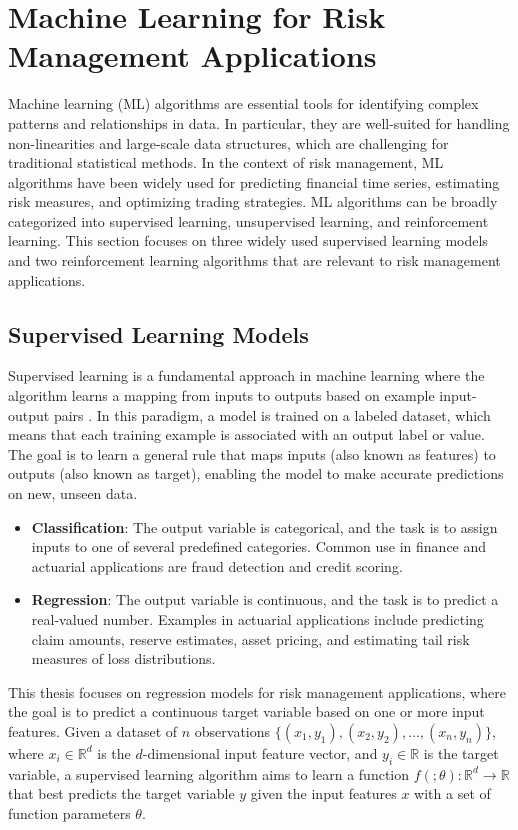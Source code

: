 \section{Machine Learning for Risk Management Applications}

Machine learning (ML) algorithms are essential tools for identifying complex patterns and relationships in data. 
In particular, they are well-suited for handling non-linearities and large-scale data structures, which are challenging for traditional statistical methods. 
In the context of risk management, ML algorithms have been widely used for predicting financial time series, estimating risk measures, and optimizing trading strategies.
ML algorithms can be broadly categorized into supervised learning, unsupervised learning, and reinforcement learning.
This section focuses on three widely used supervised learning models and two reinforcement learning algorithms that are relevant to risk management applications.

\subsection{Supervised Learning Models}

Supervised learning is a fundamental approach in machine learning where the algorithm learns a mapping from inputs to outputs based on example input-output pairs \cite{galton1886regression}. 
In this paradigm, a model is trained on a labeled dataset, which means that each training example is associated with an output label or value. 
The goal is to learn a general rule that maps inputs (also known as features) to outputs (also known as target), enabling the model to make accurate predictions on new, unseen data.

\begin{itemize} 
    \item \textbf{Classification}: The output variable is categorical, and the task is to assign inputs to one of several predefined categories. 
    Common use in finance and actuarial applications are fraud detection and credit scoring.
    \item \textbf{Regression}: The output variable is continuous, and the task is to predict a real-valued number. 
    Examples in actuarial applications include predicting claim amounts, reserve estimates, asset pricing, and estimating tail risk measures of loss distributions.
\end{itemize}

This thesis focuses on regression models for risk management applications, where the goal is to predict a continuous target variable based on one or more input features.
Given a dataset of $n$ observations $\{(x_1, y_1), (x_2, y_2), \ldots, (x_n, y_n)\}$, where $x_i \in \mathbb{R}^d$ is the $d$-dimensional input feature vector, and $y_i \in \mathbb{R}$ is the target variable, a supervised learning algorithm aims to learn a function $f(;\theta): \mathbb{R}^d \rightarrow \mathbb{R}$ that best predicts the target variable $y$ given the input features $x$ with a set of function parameters $\theta$.

